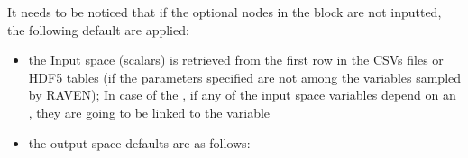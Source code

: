 \begin{itemize}
  It needs to be noticed that if the optional nodes in the block  are not inputted, the following default are applied:
    \begin{itemize}
       \item the Input space (scalars) is retrieved from the first row in the CSVs files or HDF5 tables (if the parameters specified are not 
          among the variables sampled by RAVEN); In case of the  , if any of the input space variables depend on an , they 
          are going to be linked to the  variable
       \item  the output space defaults are as follows:

\end{itemize}
\end{itemize}
